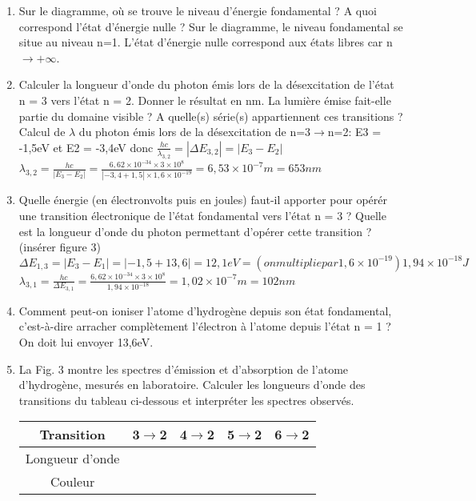 \documentclass{article}
\begin{document}
\begin{enumerate}
    \item Sur le diagramme, où se trouve le niveau d'énergie fondamental ? A quoi correspond l'état d'énergie nulle ?\newline
    Sur le diagramme, le niveau fondamental se situe au niveau n=1. L'état d'énergie nulle correspond aux états libres car n$\to +\infty$.
    \item Calculer la longueur d'onde du photon émis lors de la désexcitation de l'état n = 3 vers l'état n = 2. Donner le résultat en nm. La lumière émise fait-elle partie du domaine visible ? A quelle(s) série(s) appartiennent ces transitions ?\newline
    Calcul de $\lambda$ du photon émis lors de la désexcitation de n=3$\to$n=2:
    E3 = -1,5eV et E2 = -3,4eV donc $\frac{hc}{\lambda_{3,2}} = |\Delta E_{3,2}| = |E_{3}-E_{2}|$\newline
    $\lambda_{3,2} = \frac{hc}{|E_{3}-E_{2}|} = \frac{6,62\times 10^{-34}\times 3\times 10^{8}}{|-3,4+1,5|\times 1,6\times 10^{-19}} = 6,53\times 10^{-7}m = 653nm$
    \item Quelle énergie (en électronvolts puis en joules) faut-il apporter pour opérér une transition électronique de l'état fondamental vers l'état n = 3 ? Quelle est la longueur d'onde du photon permettant d'opérer cette transition ? (insérer figure 3)\newline
    $\Delta E_{1,3} = |E_{3}-E_{1}| = |-1,5+13,6| = 12,1 eV = (on multiplie par 1,6\times 10^{-19}) 1,94\times 10^{-18}J$\newline
    $\lambda_{3,1} = \frac{hc}{\Delta E_{3,1}} = \frac{6,62\times 10^{-34}\times 3\times 10^{8}}{1,94\times 10^{-18}} = 1,02\times 10^{-7}m = 102nm$ 
    \item Comment peut-on ioniser l'atome d'hydrogène depuis son état fondamental, c'est-à-dire arracher complètement l'électron à l'atome depuis l'état n = 1 ?\newline
    On doit lui envoyer 13,6eV.
    \item La Fig. 3 montre les spectres d'émission et d'absorption de l'atome d'hydrogène, mesurés en laboratoire. Calculer les longueurs d'onde des transitions du tableau ci-dessous et interpréter les spectres observés.
    \begin{center}
        \begin{tabular}{|c|c|c|c|c|}
            \hline
            Transition & 3$\rightarrow$2 & 4$\rightarrow$2 & 5$\rightarrow$2 & 6$\rightarrow$2 \\
            \hline
            Longueur d'onde & & & & \\
            \hline
            Couleur & & & & \\
            \hline
        \end{tabular}
    \end{center}
\end{enumerate}
\end{document}
